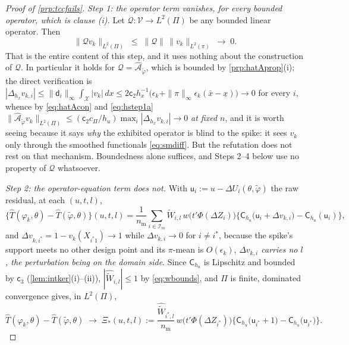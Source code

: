 \begin{proof}[Proof of \cref{prp:tccfails}]
\emph{Step 1: the operator term vanishes, for every bounded operator, which is clause (i).} Let
$\mathcal Q:\mathcal V\to L^{2}(\Pi)$ be any bounded linear operator. Then
\[
\big\|\mathcal Qv_k\big\|_{L^{2}(\Pi)}\;\le\;\|\mathcal Q\|\,\|v_k\|_{L^{2}(\pi)}\;\longrightarrow\;0 .
\]
That is the entire content of this step, and it uses nothing about the construction of
$\mathcal Q$. In particular it holds for $\mathcal Q=\hat{\mathcal A}_{\tilde\varphi}$, which is
bounded by \cref{prp:hatAprop}(i); the direct verification is
$|\Delta_{h_x}v_{k,i}|\le\|\mathsf d_i\|_\infty\int_{\mathcal X}|v_k|\,dx
\le2\mathsf c_2h_x^{-1}\big(\epsilon_k+\|\pi\|_\infty\epsilon_k(\bar x-\underline x)\big)\to0$ for every
$i$, whence by \eqref{eq:hatAcon} and \eqref{eq:hstep1a}
$\|\hat{\mathcal A}_{\tilde\varphi}v_k\|_{L^{2}(\Pi)}\le(\mathsf c_2c_\Pi/h_u)\max_i|\Delta_{h_x}v_{k,i}|\to0$
\emph{at fixed $n$}, and it is worth seeing because it says \emph{why} the exhibited operator is blind
to the spike: it sees $v_k$ only through the smoothed functionals \eqref{eq:smdiff}. But the
refutation does not rest on that mechanism. Boundedness alone suffices, and Steps 2--4 below use no
property of $\mathcal Q$ whatsoever.

\emph{Step 2: the operator-equation term does not.} With $\mathsf u_i:=u-\Delta U_i(\theta,\tilde\varphi)$ the
raw residual, at each $(u,t,l)$,
\[
\big\{\hat T(\varphi_k,\theta)-\hat T(\tilde\varphi,\theta)\big\}(u,t,l)
=\frac1{n_{\mathrm m}}\sum_{i\in\mathcal I_m}\widehat{\widetilde W}_{i,l}\,w\big(t'\Phi(\Delta Z_i)\big)
\Big\{\mathsf C_{h_u}\big(\mathsf u_i+\Delta v_{k,i}\big)-\mathsf C_{h_u}(\mathsf u_i)\Big\},
\]
and $\Delta v_{k,i^\ast}=1-v_k(X_{i^\ast1})\to1$ while $\Delta v_{k,i}\to0$ for $i\ne i^\ast$, because
the spike's support meets no other design point and its $\pi$-mean is $O(\epsilon_k)$, 
\emph{$\Delta v_{k,i}$ carries no $l$, the perturbation being on the domain side}. Since
$\mathsf C_{h_u}$ is Lipschitz and bounded by $\mathsf c_3$ (\cref{lem:intker}(i)--(ii)),
$|\widehat{\widetilde W}_{i,l}|\le1$ by \eqref{eq:wbounds}, and
$\Pi$ is finite, dominated convergence gives, in $L^{2}(\Pi)$,
\[
\hat T(\varphi_k,\theta)-\hat T(\tilde\varphi,\theta)\;\longrightarrow\;
\Xi_\ast(u,t,l):=\frac{\widehat{\widetilde W}_{i^\ast,l}}{n_{\mathrm m}}\,w\big(t'\Phi(\Delta Z_{i^\ast})\big)
\Big\{\mathsf C_{h_u}\big(\mathsf u_{i^\ast}+1\big)-\mathsf C_{h_u}\big(\mathsf u_{i^\ast}\big)\Big\} .
\]


\end{proof}
